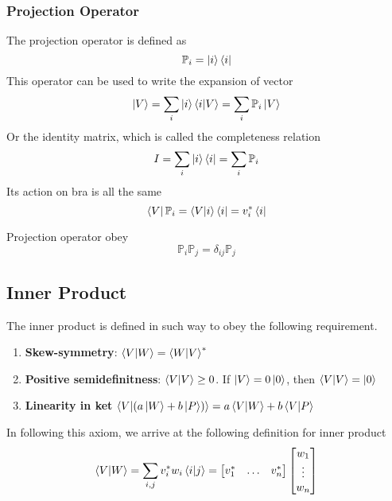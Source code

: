 \documentclass[../main.tex]{subfiles}
\begin{document}
\subsubsection*{Projection Operator}
The projection operator is defined as 
\begin{equation*}
	\mathbb{P}_i=\ket{i}\bra{i}
\end{equation*}
This operator can be used to write the expansion of vector
\begin{equation*}
	\ket{V}=\sum_i \ket{i}\braket{i|V}=\sum_i \mathbb{P}_i \ket{V}
\end{equation*}
Or the identity matrix, which is called the completeness relation
\begin{equation*}
	{I}=\sum_i \ket{i}\bra{i}=\sum_i \mathbb{P}_i
\end{equation*}
Its action on bra is all the same 
\begin{equation*}
	\bra{V}\mathbb{P}_i=\braket{V|i}\bra{i}=v_i^*\bra{i}
\end{equation*}

Projection operator obey
\begin{equation*}
	\mathbb{P}_i\mathbb{P}_j=\delta_{ij}\mathbb{P}_j
\end{equation*}

\subsection*{Inner Product}
The inner product is defined in such way to obey the following requirement.
\begin{enumerate}
	\item \textbf{Skew-symmetry}: $\braket{V|W}=\braket{W|V}^*$
	\item \textbf{Positive semidefinitness}: $\braket{V|V}\geq 0$. If $\ket{V}=0\ket{0}$, then $\braket{V|V}=\ket{0}$
	\item \textbf{Linearity in ket} $\braket{V|(a \ket{W}+b \ket{P})}=a\braket{V|W}+b\braket{V|P}$
\end{enumerate}
In following this axiom, we arrive at the following definition for inner product
\begin{equation*}
	\braket{V|W}=\sum_{i,j}v_i^*w_i\braket{i|j}=\begin{bmatrix}
		v_1^* & \dots & v_n^*
	\end{bmatrix}
	\begin{bmatrix}
		w_1    \\
		\vdots \\
		w_n
	\end{bmatrix}
\end{equation*}
\end{document}
